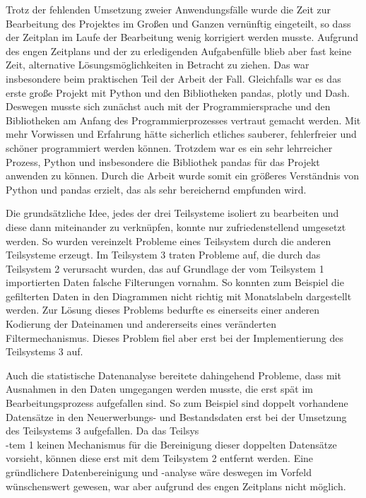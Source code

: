 Trotz der fehlenden Umsetzung zweier Anwendungsfälle wurde die Zeit zur Bearbeitung des Projektes im Großen und Ganzen vernünftig eingeteilt, 
so dass der Zeitplan im Laufe der Bearbeitung wenig korrigiert werden musste. Aufgrund des engen Zeitplans und der zu erledigenden Aufgabenfülle
blieb aber fast keine Zeit, alternative Lösungsmöglichkeiten in Betracht zu ziehen. 
Das war insbesondere beim praktischen Teil der Arbeit der Fall. Gleichfalls war es das erste große Projekt mit Python und den Bibliotheken pandas, plotly und Dash.
Deswegen musste sich zunächst auch mit der Programmiersprache und den Bibliotheken am Anfang des Programmierprozesses vertraut gemacht werden.
Mit mehr Vorwissen und Erfahrung hätte sicherlich etliches sauberer, fehlerfreier und schöner programmiert werden können. 
Trotzdem war es ein sehr lehrreicher Prozess, Python und insbesondere die Bibliothek pandas für das Projekt anwenden zu können. 
Durch die Arbeit wurde somit ein größeres Verständnis von Python und pandas erzielt, das als sehr bereichernd empfunden wird.


Die grundsätzliche Idee, jedes der drei Teilsysteme isoliert zu bearbeiten und diese dann miteinander zu verknüpfen, 
konnte nur zufriedenstellend umgesetzt werden. So wurden vereinzelt Probleme eines Teilsystem durch die anderen Teilsysteme erzeugt. 
Im Teilsystem 3 traten Probleme auf, die durch das Teilsystem 2 verursacht wurden, das auf Grundlage der 
vom Teilsystem 1 importierten Daten falsche Filterungen vornahm. So konnten zum Beispiel die gefilterten Daten 
in den Diagrammen nicht richtig mit Monatslabeln dargestellt werden. Zur Lösung dieses Problems bedurfte es einerseits einer 
anderen Kodierung der Dateinamen und andererseits eines veränderten Filtermechanismus. Dieses Problem fiel aber erst bei der 
Implementierung des Teilsystems 3 auf. 

Auch die statistische Datenanalyse bereitete dahingehend Probleme, dass mit Ausnahmen in den Daten umgegangen werden musste, die erst spät im Bearbeitungsprozess aufgefallen sind. 
So zum Beispiel sind doppelt vorhandene Datensätze in den Neuerwerbungs- und Bestandsdaten erst bei der Umsetzung des Teilsystems 3
aufgefallen. Da das Teilsys\\-tem 1 keinen Mechanismus für die Bereinigung dieser doppelten Datensätze vorsieht, können diese erst mit dem Teilsystem 2 entfernt werden.
Eine gründlichere Datenbereinigung und -analyse wäre deswegen im Vorfeld wünschenswert gewesen, war aber aufgrund des engen Zeitplans nicht möglich.



